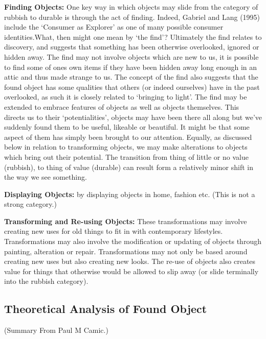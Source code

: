 \textbf{Finding Objects:} One key way in which objects may slide from the category of rubbish to durable is through the act of finding. Indeed, Gabriel and Lang (1995) include the ‘Consumer as Explorer’ as one of many possible consumer identities.What, then might one mean by ‘the find’? Ultimately the find relates to discovery, and suggests that something has been otherwise overlooked, ignored or hidden away. The find may not involve objects which are new to us, it is possible to find some of ones own items if they have been hidden away long enough in an attic and thus made strange to us. The concept of the find also suggests that the found object has some qualities that others (or indeed ourselves) have in the past overlooked, as such it is closely related to ‘bringing to light’. The find may be extended to embrace features of objects as well as objects themselves. This directs us to their ‘potentialities’, objects may have been there all along but we’ve suddenly found them to be useful, likeable or beautiful. It might be that some aspect of them has simply been brought to our attention. Equally, as discussed below in relation to transforming objects, we may make alterations to objects which bring out their potential. The transition from thing of little or no value (rubbish), to thing of value (durable) can result form a relatively minor shift in the way we see something.

\textbf{Displaying Objects:} by displaying objects in home, fashion etc. (This is not a strong category.)

\textbf{Transforming and Re-using Objects:} These transformations may involve creating new uses for old things to fit in with contemporary lifestyles. Transformations may also involve the modification or updating of objects through painting, alteration or repair. Transformations may not only be based around creating new uses but also creating new looks. The re-use of objects also creates value for things that otherwise would be allowed to slip away (or slide terminally into the rubbish category).

\subsection{Theoretical Analysis of Found Object}
(Summary From Paul M Camic.) 

